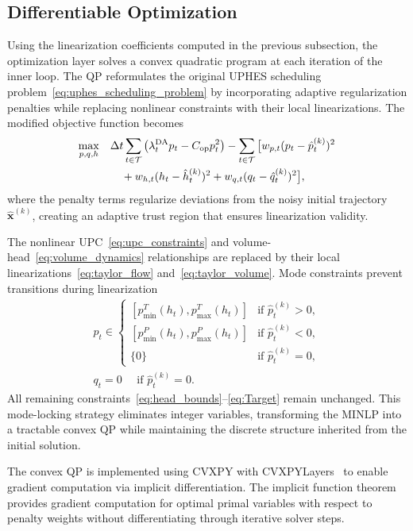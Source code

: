 \documentclass[journal]{IEEEtran}
\begin{document}
\subsection{Differentiable Optimization}
\label{subsec:diff_optimizer}

Using the linearization coefficients computed in the previous subsection, the optimization layer solves a convex quadratic program at each iteration of the inner loop. The QP reformulates the original UPHES scheduling problem~\eqref{eq:uphes_scheduling_problem} by incorporating adaptive regularization penalties while replacing nonlinear constraints with their local linearizations.
The modified objective function becomes
\begin{align}
\max_{p,q,h} \quad 
& \Delta t \sum_{t \in \mathcal{T}} \left( \lambda_t^{\text{DA}} p_t - C_{\text{op}} p_t^2 \right) - \sum_{t \in \mathcal{T}} \big[ w_{p,t} (p_t - \hat{p}_t^{(k)})^2 \notag \\
& \quad + w_{h,t} (h_t - \hat{h}_t^{(k)})^2 + w_{q,t} (q_t - \hat{q}_t^{(k)})^2 \big], \label{eq:opt_objective_penalty} 
\end{align}
where the penalty terms regularize deviations from the noisy initial trajectory $\hat{\mathbf{x}}^{(k)}$, creating an adaptive trust region that ensures linearization validity.

The nonlinear UPC~\eqref{eq:upc_constraints} and volume-head~\eqref{eq:volume_dynamics} relationships are replaced by their local linearizations~\eqref{eq:taylor_flow} and~\eqref{eq:taylor_volume}. Mode constraints prevent transitions during linearization
\begin{align}
p_t \in \begin{cases}
[p_{\min}^T(h_t), p_{\max}^T(h_t)] & \text{if } \hat{p}_t^{(k)} > 0,\\
[p_{\min}^P(h_t), p_{\max}^P(h_t)] & \text{if } \hat{p}_t^{(k)} < 0,\\
\{0\} & \text{if } \hat{p}_t^{(k)} = 0,
\end{cases} \\
    q_t = 0 \quad \text{ if } \hat{p}_t^{(k)} = 0. \label{eq:opt_mode}
\end{align}
All remaining constraints~\eqref{eq:head_bounds}--\eqref{eq:Target} remain unchanged. This mode-locking strategy eliminates integer variables, transforming the MINLP into a tractable convex QP while maintaining the discrete structure inherited from the initial solution.

The convex QP is implemented using CVXPY with CVXPYLayers~\cite{cvxpylayers2019} to enable gradient computation via implicit differentiation. The implicit function theorem provides gradient computation for optimal primal variables with respect to penalty weights without differentiating through iterative solver steps.
\end{document}

